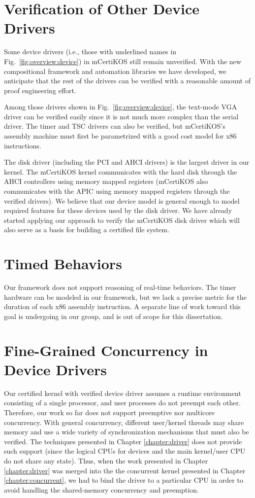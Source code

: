 \section{Verification of Other Device Drivers}
Some device drivers (i.e., those with underlined names in
Fig.~\ref{fig:overview:device}) in mCertiKOS still remain unverified.
With the new compositional framework and automation libraries we have
developed, we anticipate that the rest of the drivers can be verified
with a reasonable amount of proof engineering effort.

Among those drivers shown in Fig.~\ref{fig:overview:device}, the
text-mode VGA driver can be verified easily since it is
not much more complex than the serial driver. The timer and TSC drivers
can also be verified, but mCertiKOS's assembly machine must first be
parametrized with a good cost model for x86 instructions.

The disk driver (including the PCI and AHCI drivers) is the largest
driver in our kernel. The mCertiKOS kernel communicates with the hard
disk through the AHCI controllers using memory mapped registers
(mCertiKOS also communicates with the APIC using memory mapped
registers through the verified drivers). We believe that our device
model is general enough to model required features for these devices
used by the disk driver. We have already started applying our approach
to verify the mCertiKOS disk driver which will also serve as a basis
for building a certified file system.

\section{Timed Behaviors}

Our framework does not support reasoning of real-time behaviors.
The timer hardware can be modeled in our framework, but we lack a precise
metric for the duration of each x86 assembly instruction.
A separate line of work toward this goal is undergoing in our group, and is out of scope
for this dissertation.

\section{Fine-Grained Concurrency in Device Drivers}
Our certified kernel with verified device driver assumes a runtime environment consisting
of a single processor, and user processes do not preempt each other.
Therefore, our work so far does not support preemptive nor multicore
concurrency.  With general concurrency, different user/kernel threads
may share memory and use a wide variety of synchronization
mechanisms that must also be verified.  The techniques presented in
Chapter \ref{chapter:driver} does not provide such support (since the logical CPUs for
devices and the main kernel/user CPU do not share any state). 
Thus, when the work presented in Chapter \ref{chapter:driver} was merged
into the the concurrent kernel presented in Chapter \ref{chapter:concurrent},
we had to bind the driver to a particular CPU in order to avoid handling
the shared-memory concurrency and preemption.

